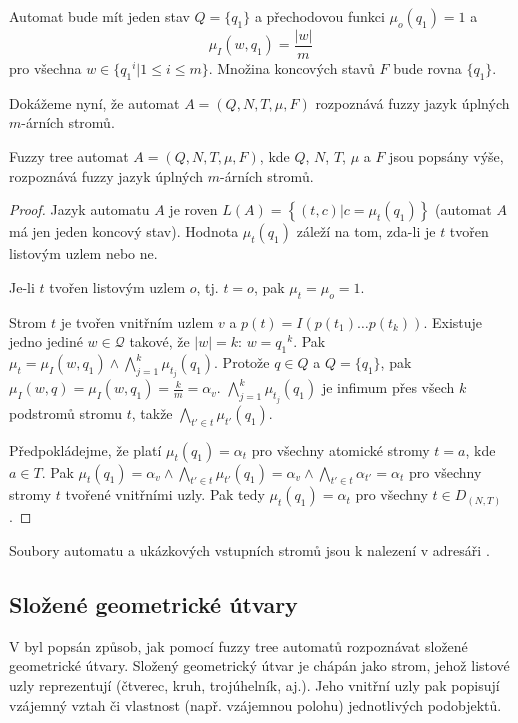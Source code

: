 \documentclass[a4paper,10pt]{article}
\begin{document}
Automat bude mít jeden stav $Q = \{ q_1 \}$ a přechodovou funkci $\mu_o(q_1) = 1$ a 
$$
  \mu_I(w, q_1) = \frac{|w|}{m}
$$
pro všechna $w \in \{ {q_1}^i |  1 \leq i \leq m \}$. Množina koncových stavů $F$ bude rovna $\{ q_1 \}$.

Dokážeme nyní, že automat $A = (Q, N, T, \mu, F)$ rozpoznává fuzzy jazyk úplných $m$-árních stromů. 

\begin{theorem}
 Fuzzy tree automat $A = (Q, N, T, \mu, F)$, kde $Q$, $N$, $T$, $\mu$ a $F$ jsou popsány výše, rozpoznává fuzzy jazyk úplných $m$-árních stromů.
\end{theorem}
\begin{proof}
 Jazyk automatu $A$ je roven $L(A) = \left\{ (t, c) | c = \mu_t(q_1) \right\}$ (automat $A$ má jen jeden koncový stav). Hodnota $\mu_t(q_1)$ záleží na tom, zda-li je $t$ tvořen listovým uzlem nebo ne.

 Je-li $t$ tvořen listovým uzlem $o$, tj. $t = o$, pak $\mu_t = \mu_o = 1$.
  
 Strom $t$ je tvořen vnitřním uzlem $v$ a $p(t) = I(p(t_1) \dots p(t_k))$. Existuje jedno jediné $w \in \mathcal{Q}$ takové, že $|w| = k$: $w = {q_1}^k$. Pak $\mu_t = \mu_I(w, q_1) \wedge \bigwedge_{j=1}^{k} \mu_{t_j}(q_1)$. Protože $q \in Q$ a $Q = \{ q_1 \}$, pak $\mu_I(w, q) = \mu_I(w, q_1) = \frac{k}{m} = \alpha_v$. $\bigwedge_{j = 1}^{k} \mu_{t_j}(q_1)$ je infimum přes všech $k$ podstromů stromu $t$, takže $\bigwedge_{t' \in t} \mu_{t'}(q_1)$.
  
 Předpokládejme, že platí $\mu_t(q_1) = \alpha_t$ pro všechny atomické stromy $t = a$, kde $a \in T$. Pak $\mu_t(q_1) = \alpha_v \wedge \bigwedge_{t' \in t} \mu_{t'}(q_1) = \alpha_v \wedge \bigwedge_{t' \in t} \alpha_{t'} = \alpha_t$ pro všechny stromy $t$ tvořené vnitřními uzly. Pak tedy $\mu_t(q_1) = \alpha_t$ pro všechny $t \in D_{(N, T)}$.
\end{proof}

Soubory automatu a ukázkových vstupních stromů jsou k nalezení v adresáři .

\subsection{Složené geometrické útvary}

V \cite{Lee-FuzTreAutSynPatRec} byl popsán způsob, jak pomocí fuzzy tree automatů rozpoznávat složené geometrické útvary. Složený geometrický útvar je chápán jako strom, jehož listové uzly reprezentují  (čtverec, kruh, trojúhelník, aj.). Jeho vnitřní uzly pak popisují vzájemný vztah či vlastnost (např. vzájemnou polohu) jednotlivých podobjektů.
\end{document}

